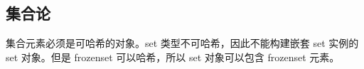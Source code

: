 \chapter{}
\section{集合论}
集合元素必须是可哈希的对象。set 类型不可哈希，因此不能构建嵌套 set 实例的 set 对象。但是 frozenset 可以哈希，所以 set 对象可以包含 frozenset 元素。